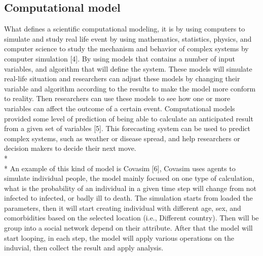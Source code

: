 \subsection{Computational model}
What defines a scientific computational modeling, it is by using computers to simulate and study real life event by using mathematics, statistics, physics, and computer science to study the mechanism and behavior of complex systems by computer simulation [4]. By using models that contains a number of input variables, and algorithm that will define the system. These models will simulate real-life situation and researchers can adjust these models by changing their variable and algorithm according to the results to make the model more conform to reality. Then researchers can use these models to see how one or more variables can affect the outcome of a certain event. Computational models provided some level of prediction of being able to calculate an anticipated result from a given set of variables [5]. This forecasting system can be used to predict complex systems, such as weather or disease spread, and help researchers or decision makers to decide their next move.\\*\\*
An example of this kind of model is Covasim [6], Covasim uses agents to simulate individual people, the model mainly focused on one type of calculation, what is the probability of an individual in a given time step will change from not infected to infected, or badly ill to death. The simulation starts from loaded the parameters, then it will start creating individual with different age, sex, and comorbidities based on the selected location (i.e., Different country). Then will be group into a social network depend on their attribute. After that the model will start looping, in each step, the model will apply various operations on the induvial, then collect the result and apply analysis. 
